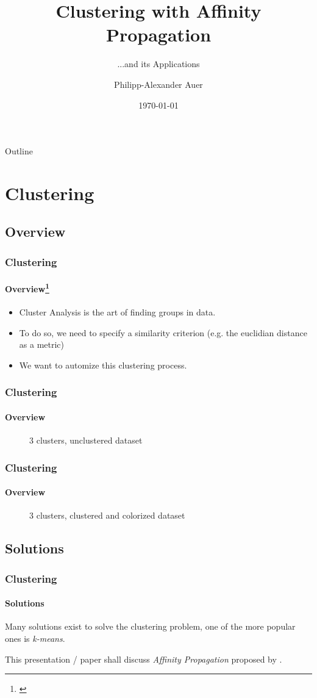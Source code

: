 \documentclass{beamer}
\title[Affinity Propagation]{%
  Clustering with Affinity Propagation
}
\subtitle{...and its Applications}
\author{Philipp-Alexander Auer}
\date{\today}
\begin{document}
\begin{frame}
  \titlepage
\end{frame}

\begin{frame}{Outline}
  \tableofcontents
\end{frame}

\section{Clustering}

\subsection[Overview]{Overview}
\begin{frame}[fragile]
  \frametitle{Clustering}
  \framesubtitle{Overview\footnote{\cite{kaufman2009finding}}}
  \begin{itemize}
  	\item Cluster Analysis is the art of finding groups in data. 
  	\item To do so, we need to specify a similarity criterion (e.g. the euclidian distance as a metric)
  	\item We want to automize this clustering process.
  	
  \end{itemize}
\end{frame}
\begin{frame}[fragile]
\frametitle{Clustering}
\framesubtitle{Overview}
\begin{figure}
	\centering
	\scalebox{0.65}{
		
	}
	\caption{3 clusters, unclustered dataset}
	\label{fig:unclust}
\end{figure}
\end{frame}

\begin{frame}[fragile]
\frametitle{Clustering}
\framesubtitle{Overview}
\begin{figure}
	\centering
	\scalebox{0.65}{
		
	}
	\caption{3 clusters, clustered and colorized dataset}
	\label{fig:clust}
\end{figure}
\end{frame}

\subsection[classical]{Solutions}
\begin{frame}
  \frametitle{Clustering}
  \framesubtitle{Solutions}
  Many solutions exist to solve the clustering problem, one of the more popular ones is \emph{k-means}. \cite{frey2007clustering}
  
  This presentation / paper shall discuss \emph{Affinity Propagation} proposed by \cite{frey2007clustering}. 
\end{frame}
\end{document}
